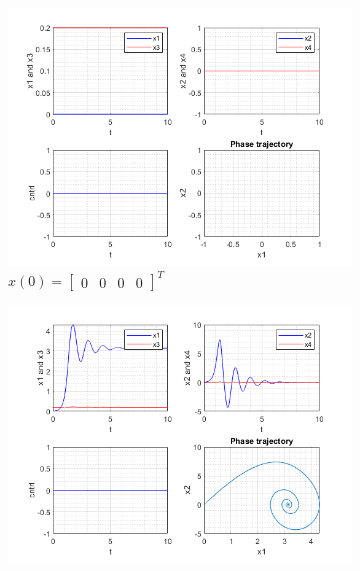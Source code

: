 \documentclass{article}
\begin{document}
\begin{figure}[htb]
\centering
\begin{subfigure}{0.49\linewidth} \centering
\includegraphics[scale=.6]{images/p1-vertical.png}
\caption*{$x(0) = \begin{bmatrix} 0 & 0 & 0 & 0 \end{bmatrix}^T$}
\end{subfigure}
\begin{subfigure}{0.49\linewidth} \centering
\includegraphics[scale=.6]{images/p1-slightly-off.png}
\end{subfigure}
\end{figure}
\end{document}
